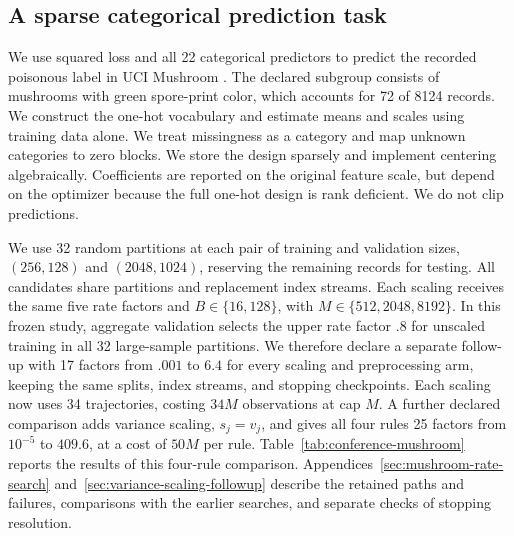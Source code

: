 \subsection{A sparse categorical prediction task}

We use squared loss and all 22 categorical predictors to predict the recorded
poisonous label in UCI Mushroom \citep{uciMushroom}. The declared subgroup
consists of mushrooms with green spore-print color, which accounts for 72 of
8124 records. We construct the one-hot vocabulary and estimate means and scales
using training data alone. We treat missingness as a category and map unknown
categories to zero blocks. We store the design sparsely and implement centering
algebraically. Coefficients are reported on the original feature scale, but
depend on the optimizer because the full one-hot design is rank deficient. We
do not clip predictions.

We use 32 random partitions at each pair of training and validation sizes,
$(256,128)$ and $(2048,1024)$, reserving the remaining records for testing. All
candidates share partitions and replacement index streams. Each scaling
receives the same five rate factors and $B \in \{16,128\}$, with
$M \in \{512,2048,8192\}$. In this frozen study, aggregate validation selects
the upper rate factor $.8$ for unscaled training in all 32 large-sample
partitions. We therefore declare a separate follow-up with 17 factors from
$.001$ to $6.4$ for every scaling and preprocessing arm, keeping the same
splits, index streams, and stopping checkpoints. Each scaling now uses 34
trajectories, costing $34M$ observations at cap $M$. A further declared
comparison adds variance scaling, $s_j = v_j$, and gives all four rules 25
factors from $10^{-5}$ to $409.6$, at a cost of $50M$ per rule.
Table~\ref{tab:conference-mushroom} reports the results of this four-rule
comparison. Appendices~\ref{sec:mushroom-rate-search}
and~\ref{sec:variance-scaling-followup} describe the retained paths and failures,
comparisons with the earlier searches, and separate checks of stopping
resolution.

